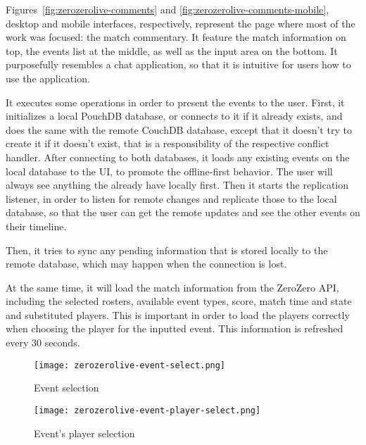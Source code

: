 Figures~\ref{fig:zerozerolive-comments} and \ref{fig:zerozerolive-comments-mobile}, desktop and mobile interfaces, respectively, represent the page where most of the work was focused: the match commentary. It feature the match information on top, the events list at the middle, as well as the input area on the bottom. It purposefully resembles a chat application, so that it is intuitive for users how to use the application.

It executes some operations in order to present the events to the user. First, it initializes a local PouchDB database, or connects to it if it already exists, and does the same with the remote CouchDB database, except that it doesn't try to create it if it doesn't exist, that is a responsibility of the respective conflict handler. After connecting to both databases, it loads any existing events on the local database to the UI, to promote the offline-first behavior. The user will always see anything the already have locally first. Then it starts the replication listener, in order to listen for remote changes and replicate those to the local database, so that the user can get the remote updates and see the other events on their timeline.

Then, it tries to sync any pending information that is stored locally to the remote database, which may happen when the connection is lost.

At the same time, it will load the match information from the ZeroZero API, including the selected rosters, available event types, score, match time and state and substituted players. This is important in order to load the players correctly when choosing the player for the inputted event. This information is refreshed every 30 seconds.

\begin{figure}[h]
    \begin{center}
        \leavevmode
        \texttt{[image: zerozerolive-event-select.png]}
        \caption{Event selection}
        \label{fig:zerozerolive-event-select}
    \end{center}
\end{figure}

\begin{figure}[h]
    \begin{center}
        \leavevmode
        \texttt{[image: zerozerolive-event-player-select.png]}
        \caption{Event's player selection}
        \label{fig:zerozerolive-event-player-select}
    \end{center}
\end{figure}

